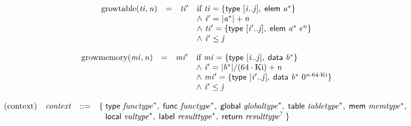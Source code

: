 \vspace{1ex}

$$
\begin{array}{@{}lcl@{}l@{}}
{\mathrm{growtable}}({\mathit{ti}}, {\mathit{n}}) &=& {\mathit{ti}'} &\quad
  \mbox{if}~{\mathit{ti}} = \{ \begin{array}[t]{@{}l@{}}
\mathsf{type}~{}[{\mathit{i}} .. {\mathit{j}}],\; \mathsf{elem}~{{\mathit{a}}^\ast} \}\end{array} \\
 &&&\quad {\land}~{\mathit{i}'} = {|{{\mathit{a}}^\ast}|} + {\mathit{n}} \\
 &&&\quad {\land}~{\mathit{ti}'} = \{ \begin{array}[t]{@{}l@{}}
\mathsf{type}~{}[{\mathit{i}'} .. {\mathit{j}}],\; \mathsf{elem}~{{\mathit{a}}^\ast}~{\epsilon^{{\mathit{n}}}} \}\end{array} \\
 &&&\quad {\land}~{\mathit{i}'} \leq {\mathit{j}} \\
\end{array}
$$

$$
\begin{array}{@{}lcl@{}l@{}}
{\mathrm{growmemory}}({\mathit{mi}}, {\mathit{n}}) &=& {\mathit{mi}'} &\quad
  \mbox{if}~{\mathit{mi}} = \{ \begin{array}[t]{@{}l@{}}
\mathsf{type}~{}[{\mathit{i}} .. {\mathit{j}}],\; \mathsf{data}~{{\mathit{b}}^\ast} \}\end{array} \\
 &&&\quad {\land}~{\mathit{i}'} = {|{{\mathit{b}}^\ast}|} / (64 \cdot {\mathrm{Ki}}) + {\mathit{n}} \\
 &&&\quad {\land}~{\mathit{mi}'} = \{ \begin{array}[t]{@{}l@{}}
\mathsf{type}~{}[{\mathit{i}'} .. {\mathit{j}}],\; \mathsf{data}~{{\mathit{b}}^\ast}~{0^{{\mathit{n}} \cdot 64 \cdot {\mathrm{Ki}}}} \}\end{array} \\
 &&&\quad {\land}~{\mathit{i}'} \leq {\mathit{j}} \\
\end{array}
$$

$$
\begin{array}{@{}lrrl@{}l@{}}
\mbox{(context)} & {\mathit{context}} &::=& \{\; \begin{array}[t]{@{}l@{}l@{}}
\mathsf{type}~{{\mathit{functype}}^\ast},\; \mathsf{func}~{{\mathit{functype}}^\ast},\; \mathsf{global}~{{\mathit{globaltype}}^\ast},\; \mathsf{table}~{{\mathit{tabletype}}^\ast},\; \mathsf{mem}~{{\mathit{memtype}}^\ast},\; \\
  \mathsf{local}~{{\mathit{valtype}}^\ast},\; \mathsf{label}~{{\mathit{resulttype}}^\ast},\; \mathsf{return}~{{\mathit{resulttype}}^?} \;\}\end{array} \\
\end{array}
$$

